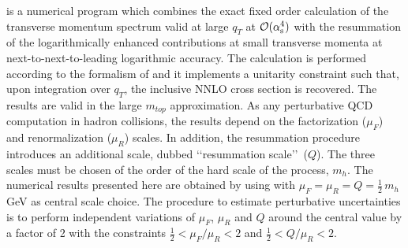 \subsubsection{\HqT}
\label{sec:hjetscomp:tools:ares:hqt}

\HqT \cite{Bozzi:2005wk,deFlorian:2011xf} is a numerical program which 
combines the exact fixed order calculation of the transverse momentum 
spectrum valid at large $q_T$ at ${\cal O}(\alpha_\mathrm{s}^4)$ with the 
resummation of the logarithmically enhanced contributions at small 
transverse momenta at next-to-next-to-leading logarithmic accuracy.
The calculation is performed according to the formalism of 
\cite{Catani:2000vq,Bozzi:2005wk} and it implements a unitarity 
constraint such that, upon integration over $q_T$, the inclusive 
NNLO cross section is recovered. The results are valid in the large 
$m_{top}$ approximation. As any perturbative QCD computation in hadron 
collisions, the results depend on the factorization ($\mu_F$) and 
renormalization ($\mu_R$) scales. In addition, the resummation procedure 
introduces an additional scale, dubbed \lq\lq resummation scale\rq\rq\ 
($Q$). The three scales must be chosen of the order of the hard scale 
of the process, $m_h$. The numerical results presented here are obtained 
by using \HqT-2.0 with $\mu_F=\mu_R=Q=\tfrac{1}{2}\,m_h$ GeV as central scale choice. 
The procedure to estimate perturbative uncertainties is to perform 
independent variations of $\mu_F$, $\mu_R$ and $Q$ around the central 
value by a factor of 2 with the constraints $\tfrac{1}{2} < \mu_F/\mu_R < 2$ and 
$\tfrac{1}{2} <Q/\mu_R<2$.